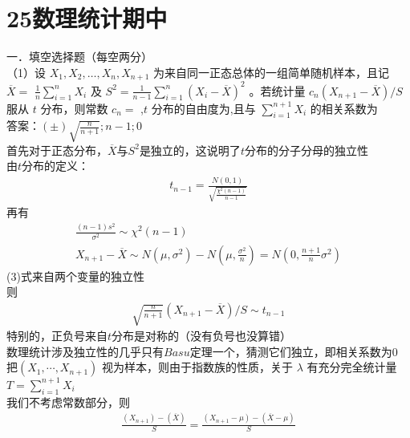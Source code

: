 \documentclass[UTF8,openany]{book}
\begin{document}
	\section{\centering 25数理统计期中}
	\noindent 一．填空选择题（每空两分）\\
	（1）设 $X_{1}, X_{2}, \ldots, X_{n}, X_{n+1}$ 为来自同一正态总体的一组简单随机样本，且记 $\overline{X}=$ $\frac{1}{n} \sum_{i=1}^{n} X_{i}$ 及 $S^{2}=\frac{1}{n-1} \sum_{i=1}^{n}\left(X_{i}-\overline{X}\right)^{2}$ 。若统计量 $c_{n}\left(X_{n+1}-\overline{X}\right) / S$ 服从 $t$ 分布，则常数 $c_{n}=$\underline{\hspace{1cm}} ,$t$ 分布的自由度为\underline{\hspace{1cm}},且与 $\sum_{i=1}^{n+1} X_{i}$ 的相关系数为\underline{\hspace{1cm}}\\
	答案：$(\pm) \sqrt{\frac{n}{n+1}} ; n-1 ; 0$\\
	首先对于正态分布，$\overline{X}$与$S^2$是独立的，这说明了$t$分布的分子分母的独立性\\
	由$t$分布的定义：
	\begin{gather}
		t_{n-1}=\frac{N(0,1)}{\sqrt{\frac{\chi^2(n-1)}{n-1}}}
	\end{gather}
	再有\\
	\begin{gather}
		\frac{(n-1) s^2}{\sigma^2} \sim \chi^2(n-1) \\
		X_{n+1} - \overline{X} \sim N\left(\mu, \sigma^2\right) - N\left(\mu, \frac{\sigma^2}{n}\right) = N\left(0, \frac{n+1}{n} \sigma^2\right)
	\end{gather}
	(3)式来自两个变量的独立性\\
	则\\
	\begin{gather}
		\sqrt{\frac{n}{n+1}}\left(X_{n+1}-\overline{X}\right) / S \sim t_{n-1}
	\end{gather}
	特别的，正负号来自$t$分布是对称的（没有负号也没算错）\\
	数理统计涉及独立性的几乎只有$Basu$定理一个，猜测它们独立，即相关系数为$0$\\
	把$\left(X_1, \cdots, X_{n+1}\right)$ 视为样本，则由于指数族的性质，关于 $\lambda$ 有充分完全统计量$T=\sum_{i=1}^{n+1} X_i$\\
	我们不考虑常数部分，则\\
	\begin{gather}
		\frac{\left(X_{n+1}\right)-\left(\overline{X}\right)}{S}=\frac{\left(X_{n+1}-\mu\right)-\left(\overline{X}-\mu\right)}{S}
	\end{gather}
\end{document}
